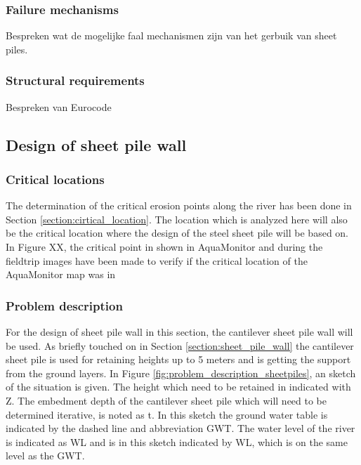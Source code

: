 \subsubsection{Failure mechanisms}

Bespreken wat de mogelijke faal mechanismen zijn van het gerbuik van sheet piles.

\subsubsection{Structural requirements}

Bespreken van Eurocode

\subsection{Design of sheet pile wall}

\subsubsection{Critical locations}

The determination of the critical erosion points along the river has been done in Section \ref{section:cirtical_location}. The location which is analyzed here will also be the critical location where the design of the steel sheet pile will be based on. In Figure XX, the critical point in shown in AquaMonitor and during the fieldtrip images have been made to verify if the critical location of the AquaMonitor map was in 



\subsubsection{Problem description}

For the design of sheet pile wall in this section, the cantilever sheet pile wall will be used. As briefly touched on in Section \ref{section:sheet_pile_wall} the cantilever sheet pile is used for retaining heights up to 5 meters and is getting the support from the ground layers. In Figure \ref{fig:problem_description_sheetpiles}, an sketch of the situation is given. The height which need to be retained in indicated with Z. The embedment depth of the cantilever sheet pile which will need to be determined iterative, is noted as t. In this sketch the ground water table is indicated by the dashed line and abbreviation GWT. The water level of the river is indicated as WL and is in this sketch indicated by WL, which is on the same level as the GWT. 

